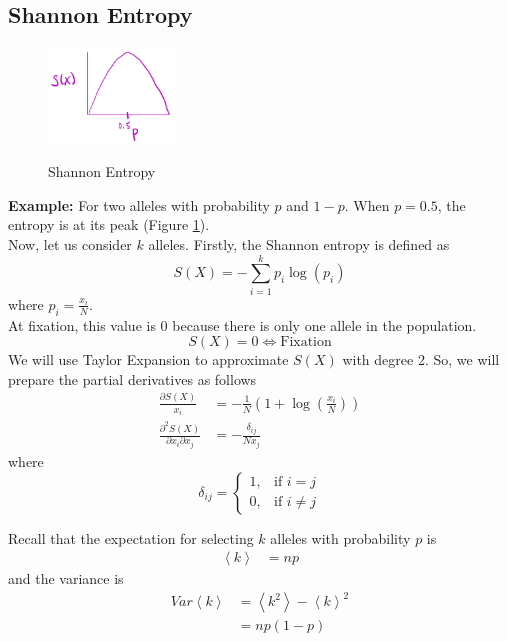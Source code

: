 \documentclass[12pt]{extarticle}
\newcommand{\<}{\langle}
\renewcommand{\>}{\rangle}
\theoremstyle{definition}
\begin{document}
\subsection{Shannon Entropy}

\begin{figure}[h]
\caption{Shannon Entropy}
\centering
\includegraphics[width=0.3\textwidth]{fig2.png}
\label{fig2}
\end{figure}

\noindent \textbf{Example:} For two alleles with probability $p$ and $1 - p$. When $p = 0.5$, the entropy is at its peak (Figure \ref{fig2}).\\

\newpage\noindent Now, let us consider $k$ alleles. Firstly, the Shannon entropy is defined as
\begin{equation}
    S(X) = -\sum_{i = 1}^k p_i \log(p_i) \label{S_X}
\end{equation}
where $\displaystyle p_i = \frac{x_i}{N}$. \\

\noindent At fixation, this value is $0$ because there is only one allele in the population.
\begin{equation}
    S(X) = 0 \Longleftrightarrow \text{Fixation} \nonumber
\end{equation}
We will use Taylor Expansion to approximate $S(X)$ with degree 2. So, we will prepare the partial derivatives as follows
\begin{align}
    \frac{\partial S(X)}{x_i} &= -\frac{1}{N}(1 + \log(\frac{x_i}{N})) \nonumber \\
    \frac{\partial^2 S(X)}{\partial x_i \partial x_j} &= -\frac{\delta_{ij}}{Nx_j} \label{partial^2}
\end{align}
where
\begin{equation}
    \delta_{ij} = \begin{cases}
        1, & \text{if } i = j\\
        0, & \text{if } i \neq j
    \end{cases} \label{delta}
\end{equation}

\noindent Recall that the expectation for selecting $k$ alleles with probability $p$ is
\begin{align}
    \left< k \right> &= np \label{exp}
\end{align}
and the variance is
\begin{align}
    Var \left< k \right> &= \left< k^2 \right> - \left< k \right>^2 \label{var1} \\
    &= np(1-p) \label{var2}
\end{align}
\end{document}
